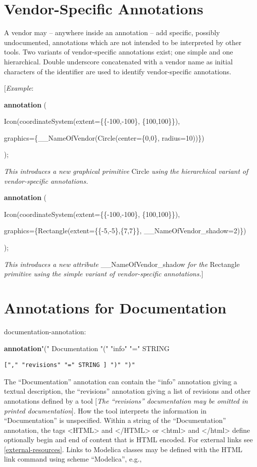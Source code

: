 \documentclass[10pt,a4paper]{report}
\def\doublelabel#1{\label{#1}\hypertarget{#1}{}}
\begin{document}
\section{Vendor-Specific Annotations}\doublelabel{vendor-specific-annotations}

A vendor may -- anywhere inside an annotation -- add specific, possibly
undocumented, annotations which are not intended to be interpreted by
other tools. Two variants of vendor-specific annotations exist; one
simple and one hierarchical. Double underscore concatenated with a
vendor name as initial characters of the identifier are used to identify
vendor-specific annotations.

{[}\emph{Example}:

\textbf{annotation} (

Icon(coordinateSystem(extent=\{\{-100,-100\}, \{100,100\}\}),

graphics=\{\_\_NameOfVendor(Circle(center=\{0,0\}, radius=10))\})

);

\emph{This introduces a new graphical primitive} Circle \emph{using the
hierarchical variant of vendor-specific annotations.}

\textbf{annotation} (

Icon(coordinateSystem(extent=\{\{-100,-100\}, \{100,100\}\}),

graphics=\{Rectangle(extent=\{\{-5,-5\},\{7,7\}\},
\_\_NameOfVendor\_shadow=2)\})

);

\emph{This introduces a new attribute} \_\_NameOfVendor\_shadow
\emph{for the} Rectangle \emph{primitive using the simple variant of
vendor-specific annotations.}{]}

\section{Annotations for Documentation}\doublelabel{annotations-for-documentation}

documentation-annotation:

\textbf{annotation}"(" Documentation "(" "info" "=" STRING

\begin{lstlisting}[language=modelica]
  ["," "revisions" "=" STRING ] ")" ")"
\end{lstlisting}
The ``Documentation'' annotation can contain the ``info'' annotation
giving a textual description, the ``revisions'' annotation giving a list
of revisions and other annotations defined by a tool {[}\emph{The
``revisions'' documentation may be omitted in printed documentation}{]}.
How the tool interprets the information in ``Documentation'' is
unspecified. Within a string of the ``Documentation'' annotation, the
tags \textless{}HTML\textgreater{} and \textless{}/HTML\textgreater{} or
\textless{}html\textgreater{} and \textless{}/html\textgreater{} define
optionally begin and end of content that is HTML encoded. For external
links see \ref{external-resources}. Links to Modelica classes may be defined with
the HTML link command using scheme ``Modelica'', e.g.,
\end{document}
